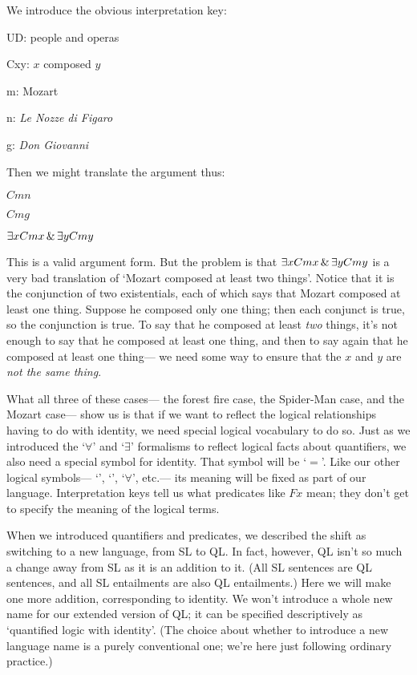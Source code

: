 We introduce the obvious interpretation key:

\begin{ekey}
\item[UD:] people and operas
\item[Cxy:] $x$ composed $y$
\item[m:] Mozart
\item[n:] \emph{Le Nozze di Figaro}
\item[g:] \emph{Don Giovanni}
\end{ekey}

Then we might translate the argument thus:

\begin{earg}
\item[] $Cmn$
\item[] $Cmg$
\item[\therefore] $\exists x Cmx \,\&\, \exists y Cmy$
\end{earg}

This is a valid argument form. But the problem is that $\exists x Cmx \,\&\, \exists y Cmy$ is a very bad translation of `Mozart composed at least two things'. Notice that it is the conjunction of two existentials, each of which says that Mozart composed at least one thing. Suppose he composed only one thing; then each conjunct is true, so the conjunction is true. To say that he composed at least \emph{two} things, it's not enough to say that he composed at least one thing, and then to say again that he composed at least one thing--- we need some way to ensure that the $x$ and $y$ are \emph{not the same thing}.

What all three of these cases--- the forest fire case, the Spider-Man case, and the Mozart case--- show us is that if we want to reflect the logical relationships having to do with identity, we need special logical vocabulary to do so. Just as we introduced the `$\forall$' and `$\exists$' formalisms to reflect logical facts about quantifiers, we also need a special symbol for identity. That symbol will be `$=$'. Like our other logical symbols--- `\eif', `\enot', `$\forall$', etc.--- its meaning will be fixed as part of our language. Interpretation keys tell us what predicates like $Fx$ mean; they don't get to specify the meaning of the logical terms.

When we introduced quantifiers and predicates, we described the shift as switching to a new language, from SL to QL. In fact, however, QL isn't so much a change away from SL as it is an addition to it. (All SL sentences are QL sentences, and all SL entailments are also QL entailments.) Here we will make one more addition, corresponding to identity. We won't introduce a whole new name for our extended version of QL; it can be specified descriptively as `quantified logic with identity'. (The choice about whether to introduce a new language name is a purely conventional one; we're here just following ordinary practice.)

